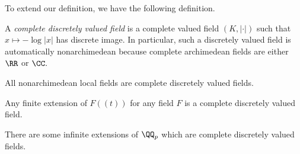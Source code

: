 \documentclass[../notes.tex]{subfiles}
\begin{document}
To extend our definition, we have the following definition.
\begin{definition}
	A \textit{complete discretely valued field} is a complete valued field $(K,|\cdot|)$ such that $x\mapsto-\log|x|$ has discrete image. In particular, such a discretely valued field is automatically nonarchimedean because complete archimedean fields are either $\RR$ or $\CC.$
\end{definition}
\begin{example}
	All nonarchimedean local fields are complete discretely valued fields.
\end{example}
\begin{example}
	Any finite extension of $F((t))$ for any field $F$ is a complete discretely valued field.
\end{example}
\begin{example}
	There are some infinite extensions of $\QQ_p$ which are complete discretely valued fields.
\end{example}
\end{document}
